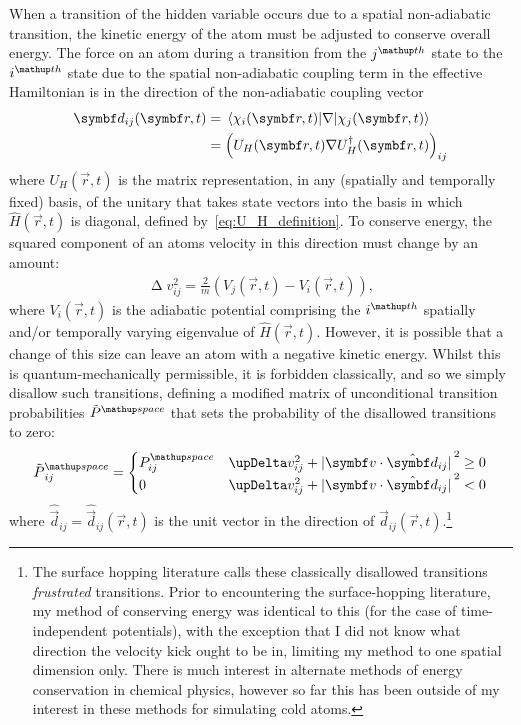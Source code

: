 When a transition of the hidden variable occurs due to a spatial non-adiabatic transition, the kinetic energy of the atom must be adjusted to conserve overall energy. The force on an atom during a transition from the $j^\up{th}$ state to the $i^\up{th}$ state due to the spatial non-adiabatic coupling term in the effective Hamiltonian is in the direction of the non-adiabatic coupling vector~\cite{doi:10.1146/annurev-physchem-040215-112245}
\begin{align}\label{eq:non_adiabatic_coupling_vector}
\vec d_{ij}(\vec r, t) &= \matrixel{\chi_i(\vec r, t)}{\nabla}{\chi_j(\vec r, t)}\\
&= \left(U_H(\vec r, t)\nabla U_H^\dagger(\vec r, t)\right)_{ij}
\end{align}
where $U_H(\vec r, t)$ is the matrix representation, in any (spatially and temporally fixed) basis, of the unitary that takes state vectors into the basis in which $\hat H(\vec r, t)$ is diagonal, defined by~\eqref{eq:U_H_definition}. To conserve energy, the squared component of an atoms velocity in this direction must change by an amount:
\begin{align}\label{eq:delta_v_squared}
\upDelta v_{ij}^2 = \frac2m\left(V_j(\vec r, t) - V_i(\vec r, t)\right),
\end{align}
where $V_i(\vec r, t)$ is the adiabatic potential comprising the $i^\up{th}$ spatially and/or temporally varying eigenvalue of $\hat H(\vec r, t)$. However, it is possible that a change of this size can leave an atom with a negative kinetic energy. Whilst this is quantum-mechanically permissible, it is forbidden classically, and so we simply disallow such transitions, defining a modified matrix of unconditional transition probabilities $\tilde P^\up{space}$ that sets the probability of the disallowed transitions to zero:
\begin{align}\label{eq:tilde_P_space}
\tilde P^\up{space}_{ij} =
\begin{cases}
P^\up{space}_{ij} & \upDelta v_{ij}^2 + \abs{\vec v\cdot\hat{\vec d}_{ij}}^2 \geq 0 \\
0 & \upDelta v_{ij}^2 + \abs{\vec v\cdot\hat{\vec d}_{ij}}^2 < 0
\end{cases}
\end{align}
where $\hat{\vec d}_{ij} = \hat{\vec d}_{ij}(\vec r, t)$ is the unit vector in the direction of $\vec d_{ij}(\vec r, t)$.\footnote{The surface hopping literature calls these classically disallowed transitions \emph{frustrated} transitions. Prior to encountering the surface-hopping literature, my method of conserving energy was identical to this (for the case of time-independent potentials), with the exception that I did not know what direction the velocity kick ought to be in, limiting my method to one spatial dimension only. There is much interest in alternate methods of energy conservation in chemical physics, however so far this has been outside of my interest in these methods for simulating cold atoms.}

